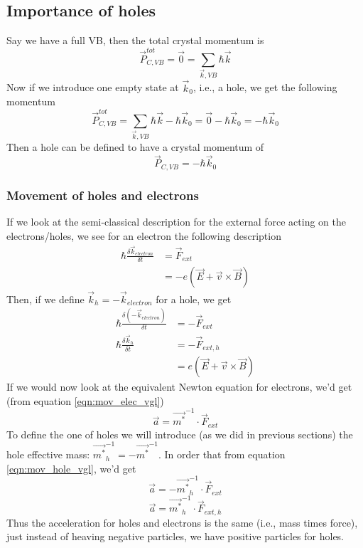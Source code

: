 \subsection{Importance of holes}
Say we have a full VB, then the total crystal momentum is $$\vec{P}_{C, VB}^{tot} = \vec{0} = \sum_{\vec{k}, VB}\hbar\vec{k}$$
Now if we introduce one empty state at $\vec{k}_0$, i.e., a hole, we get the following momentum $$\vec{P}_{C, VB}^{tot} = \sum_{\vec{k}, VB}\hbar\vec{k} - \hbar\vec{k}_0 = \vec{0} - \hbar\vec{k}_0 = - \hbar\vec{k}_0$$
Then a hole can be defined to have a crystal momentum of $$\vec{P}_{C, VB} = - \hbar\vec{k}_0$$

\subsubsection{Movement of holes and electrons}
If we look at the semi-classical description for the external force acting on the electrons/holes, we see for an electron the following description
\begin{align}
	\hbar\frac{\delta \vec{k}_{electron}}{\delta t} &= \vec{F}_{ext} \label{eqn:mov_elec_vgl} \\
	&= -e(\vec{E} + \vec{v}\times\vec{B})
\end{align}
Then, if we define $\vec{k}_h = -\vec{k}_{electron}$ for a hole, we get
\begin{align}
	\hbar\frac{\delta (- \vec{k}_{electron})}{\delta t} &= -\vec{F}_{ext} \\
	\hbar\frac{\delta \vec{k}_{h}}{\delta t} &= -\vec{F}_{ext, h} \label{eqn:mov_hole_vgl} \\
	&= e(\vec{E} + \vec{v}\times\vec{B})
\end{align}
If we would now look at the equivalent Newton equation for electrons, we'd get (from equation \ref{eqn:mov_elec_vgl}) $$\vec{a} = \vec{m^*}^{-1}\cdot\vec{F}_{ext}$$
To define the one of holes we will introduce (as we did in previous sections) the hole effective mass: $\vec{m^*}^{-1}_h = -\vec{m^*}^{-1}$. In order that from equation \ref{eqn:mov_hole_vgl}, we'd get $$\vec{a} = -\vec{m^*}^{-1}_h\cdot\vec{F}_{ext}$$ $$\vec{a} = \vec{m^*}^{-1}_h\cdot\vec{F}_{ext, h}$$
Thus the acceleration for holes and electrons is the same (i.e., mass times force), just instead of heaving negative particles, we have positive particles for holes.
